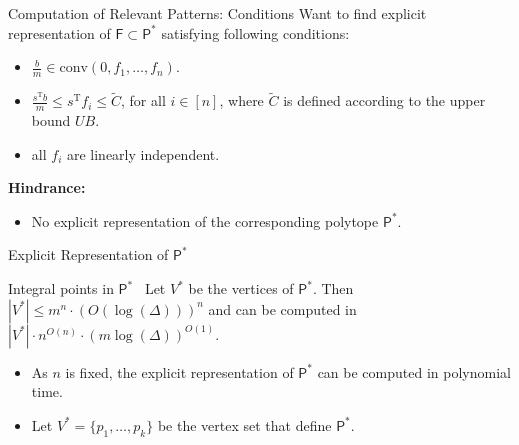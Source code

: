\documentclass[xcolor=table]{beamer} %
\theoremstyle{definition}
\theoremstyle{plain}
\theoremstyle{remark}
\renewcommand{\b}[1]{\textcolor{dblue}{#1}}
\begin{document}
\begin{frame}{Computation of Relevant Patterns: Conditions}
    \b{Want to find explicit representation of $\mathsf{F} \subset \mathsf{P}^*$ satisfying following conditions:}
    
    \begin{itemize}
        \item $\frac{b}{m} \in \text{conv}(0, f_1, \ldots, f_n)$. 

        \item $\frac{s^\text{T} b}{m} \leq s^\text{T} f_i \leq \widetilde{C}$, for all $i \in [n]$, where $\widetilde{C}$ is defined according to the upper bound $UB$.
        
        \item all $f_i$ are linearly independent.
    \end{itemize}
    
    \textbf{\b{Hindrance:}} 
        \begin{itemize}
            \item No explicit representation of the corresponding polytope $\mathsf{P}^*$.
        \end{itemize}
\end{frame}


\begin{frame}{Explicit Representation of $\mathsf{P}^*$}
    \begin{alertblock}{Integral points in $\mathsf{P}^*$~\cite{cook1992integer, hartmann1988cutting}}
    Let $V^*$ be the vertices of $\mathsf{P}^*$. Then $|V^*| \leq m^n \cdot (O(\log( \Delta)))^n$ and can be computed in $|V^*| \cdot n^{O(n)} \cdot (m \log (\Delta))^{O(1)}$.
    \end{alertblock}
    
    \begin{itemize}
        \item As $n$ is fixed, the explicit representation of $\mathsf{P}^*$ can be computed in polynomial time.
        
        \item Let $V^* = \{p_1, \ldots, p_k\}$ be the vertex set that define $\mathsf{P}^*.$
    \end{itemize}
    
\end{frame}
\end{document}
